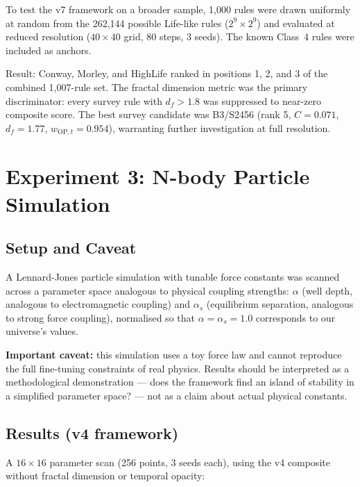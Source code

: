 \documentclass[12pt,a4paper]{article}
\begin{document}
To test the v7 framework on a broader sample, 1,000 rules were drawn
uniformly at random from the 262,144 possible Life-like rules
($2^9\times2^9$) and evaluated at reduced resolution
($40\times40$ grid, 80 steps, 3 seeds).
The known Class~4 rules were included as anchors.

Result: Conway, Morley, and HighLife ranked in positions 1, 2, and 3
of the combined 1,007-rule set.
The fractal dimension metric was the primary discriminator: every
survey rule with $d_f>1.8$ was suppressed to near-zero composite
score.
The best survey candidate was B3/S2456 (rank 5, $C=0.071$,
$d_f=1.77$, $w_{\text{OP},t}=0.954$), warranting further
investigation at full resolution.

\section{Experiment 3: N-body Particle Simulation}

\subsection{Setup and Caveat}

A Lennard-Jones particle simulation with tunable force constants was
scanned across a parameter space analogous to physical coupling
strengths: $\alpha$ (well depth, analogous to electromagnetic
coupling) and $\alpha_s$ (equilibrium separation, analogous to strong
force coupling), normalised so that $\alpha=\alpha_s=1.0$ corresponds
to our universe's values.

\textbf{Important caveat:} this simulation uses a toy force law and
cannot reproduce the full fine-tuning constraints of real physics.
Results should be interpreted as a methodological demonstration ---
does the framework find an island of stability in a simplified
parameter space? --- not as a claim about actual physical constants.

\subsection{Results (v4 framework)}

A $16\times16$ parameter scan (256 points, 3 seeds each), using the
v4 composite without fractal dimension or temporal opacity:
\end{document}
